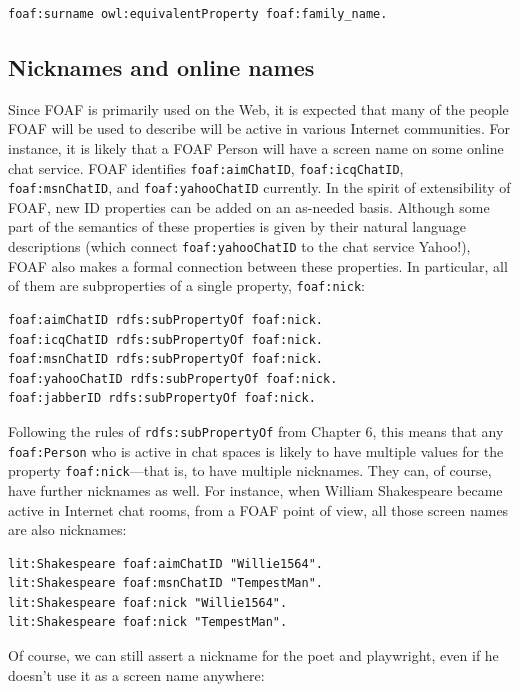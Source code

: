 \begin{lstlisting}
foaf:surname owl:equivalentProperty foaf:family_name.
\end{lstlisting}

\subsection{Nicknames and online names}

Since FOAF is primarily used on the Web, it is expected that many of the
people FOAF will be used to describe will be active in various Internet
communities. For instance, it is likely that a FOAF Person will have a
screen name on some online chat service. FOAF identifies \texttt{foaf:aimChatID},
\texttt{foaf:icqChatID}, \texttt{foaf:msnChatID}, and \texttt{foaf:yahooChatID} currently. In the
spirit of extensibility of FOAF, new ID properties can be added on an
as-needed basis. Although some part of the semantics of these properties
is given by their natural language descriptions (which connect
\texttt{foaf:yahooChatID} to the chat service Yahoo!), FOAF also makes a formal
connection between these properties. In particular, all of them are
subproperties of a single property, \texttt{foaf:nick}:

\begin{lstlisting}
foaf:aimChatID rdfs:subPropertyOf foaf:nick.
foaf:icqChatID rdfs:subPropertyOf foaf:nick.
foaf:msnChatID rdfs:subPropertyOf foaf:nick.
foaf:yahooChatID rdfs:subPropertyOf foaf:nick.
foaf:jabberID rdfs:subPropertyOf foaf:nick.
\end{lstlisting}

Following the rules of \texttt{rdfs:subPropertyOf} from Chapter 6, this means
that any \texttt{foaf:Person} who is active in chat spaces is likely to have
multiple values for the property \texttt{foaf:nick}---that is, to have multiple
nicknames. They can, of course, have further nicknames as well. For
instance, when William Shakespeare became active in Internet chat rooms,
from a FOAF point of view, all those screen names are also nicknames:

\begin{lstlisting}
lit:Shakespeare foaf:aimChatID "Willie1564".
lit:Shakespeare foaf:msnChatID "TempestMan".
lit:Shakespeare foaf:nick "Willie1564".
lit:Shakespeare foaf:nick "TempestMan".
\end{lstlisting}

Of course, we can still assert a nickname for the poet and playwright,
even if he doesn't use it as a screen name anywhere:

